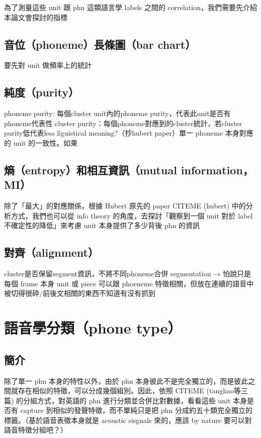 為了測量這些 unit 跟 phn 這類語言學 labels 之間的 correlation，我們需要先介紹本論文會探討的指標


\subsection{音位（phoneme）長條圖（bar chart）}
要先對 unit 做頻率上的統計
\subsection{純度（purity）}
phoneme purity: 每個cluster unit內的phoneme purity，代表此unit是否有phoneme代表性
cluster purity：每個phoneme對應到的cluster統計，若cluster purity低代表less liguistical meaning?（抄hubert paper）單一 phoneme 本身對應的 unit 的一致性。如果

\subsection{熵（entropy）和相互資訊（mutual information，MI）}
除了「最大」的對應關係，根據 Hubert 原先的 paper CITEME (hubert) 中的分析方式，我們也可以從 info theory 的角度，去探討「觀察到一個 unit 對於 label 不確定性的降低」來考慮 unit 本身提供了多少背後 phn 的資訊

\subsection{對齊（alignment）}
cluster是否保留segment資訊，不將不同phoneme合併
segmentation → 
怕說只是每個 frame 本身 unit 或 piece 可以跟 phoeneme 特徵相關，但放在連續的語音中被切得很碎/前後文相關的東西不知道有沒有抓到


\section{語音學分類（phone type）}

\subsection{簡介}

除了單一 phn 本身的特性以外，由於 phn 本身彼此不是完全獨立的，而是彼此之間就存在相似的特徵，可以分成幾個組別。因此，依照 CITEME (tanghao等三篇) 的分組方式，對英語的 phn 進行分類並合併比對數據，看看這些 unit 本身是否有 capture 到相似的發聲特徵，而不單純只是把 phn 分成約五十類完全獨立的標籤。（基於語音表徵本身就是 acoustic sisgnals 來的，應該 by nature 要可以對語音特徵分組吧？）

